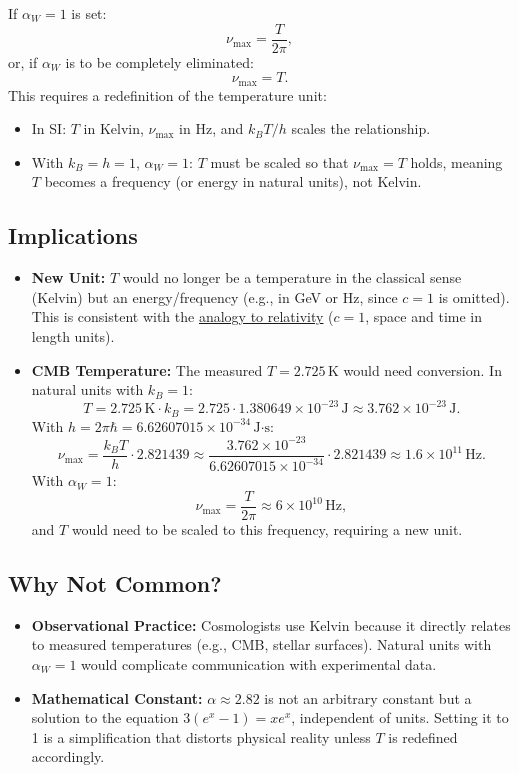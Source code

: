 \documentclass[12pt,a4paper]{article}
\begin{document}
	If $\alpha_W = 1$ is set:
	\[
	\nu_{\text{max}} = \frac{T}{2\pi},
	\]
	or, if $\alpha_W$ is to be completely eliminated:
	\[
	\nu_{\text{max}} = T.
	\]
	This requires a redefinition of the temperature unit:
	\begin{itemize}
		\item In SI: $T$ in Kelvin, $\nu_{\text{max}}$ in Hz, and $k_B T / h$ scales the relationship.
		\item With $k_B = h = 1$, $\alpha_W = 1$: $T$ must be scaled so that $\nu_{\text{max}} = T$ holds, meaning $T$ becomes a frequency (or energy in natural units), not Kelvin.
	\end{itemize}
	
	\subsection{Implications}
	
	\begin{itemize}
		\item \textbf{New Unit:} $T$ would no longer be a temperature in the classical sense (Kelvin) but an energy/frequency (e.g., in GeV or Hz, since $c = 1$ is omitted). This is consistent with the \href{https://github.com/jpascher/T0-Time-Mass-Duality/tree/main/2/pdf/English/Eine neue Perspektive auf Zeit und Raum Johann Paschers revolutionäre Ideen_en.pdf}{analogy to relativity} ($c = 1$, space and time in length units).
		\item \textbf{CMB Temperature:} The measured $T = 2.725 \, \text{K}$ would need conversion. In natural units with $k_B = 1$:
		\[
		T = 2.725 \, \text{K} \cdot k_B = 2.725 \cdot 1.380649 \times 10^{-23} \, \text{J} \approx 3.762 \times 10^{-23} \, \text{J}.
		\]
		With $h = 2\pi \hbar = 6.62607015 \times 10^{-34} \, \text{J·s}$:
		\[
		\nu_{\text{max}} = \frac{k_B T}{h} \cdot 2.821439 \approx \frac{3.762 \times 10^{-23}}{6.62607015 \times 10^{-34}} \cdot 2.821439 \approx 1.6 \times 10^{11} \, \text{Hz}.
		\]
		With $\alpha_W = 1$:
		\[
		\nu_{\text{max}} = \frac{T}{2\pi} \approx 6 \times 10^{10} \, \text{Hz},
		\]
		and $T$ would need to be scaled to this frequency, requiring a new unit.
	\end{itemize}
	
	\subsection{Why Not Common?}
	
	\begin{itemize}
		\item \textbf{Observational Practice:} Cosmologists use Kelvin because it directly relates to measured temperatures (e.g., CMB, stellar surfaces). Natural units with $\alpha_W = 1$ would complicate communication with experimental data.
		\item \textbf{Mathematical Constant:} $\alpha \approx 2.82$ is not an arbitrary constant but a solution to the equation $3 (e^x - 1) = x e^x$, independent of units. Setting it to 1 is a simplification that distorts physical reality unless $T$ is redefined accordingly.
	\end{itemize}
	
\end{document}
